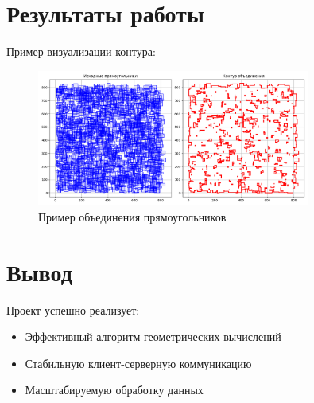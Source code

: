 \documentclass[a4paper, 12pt]{article}
\begin{document}
\section*{Результаты работы}
Пример визуализации контура:

\begin{figure}[h]
\centering
\includegraphics[width=0.8\textwidth]{contour_example.png}
\caption{Пример объединения прямоугольников}
\end{figure}

\section*{Вывод}
Проект успешно реализует:
\begin{itemize}
\item Эффективный алгоритм геометрических вычислений
\item Стабильную клиент-серверную коммуникацию
\item Масштабируемую обработку данных
\end{itemize}
\end{document}
